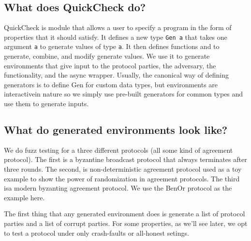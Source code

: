 


\subsection{What does QuickCheck do?}
QuickCheck is module that allows a user to specify a program in the form of properties that it should satisfy. 
It defines a new type \texttt{Gen a} that takes one argument \texttt{a} to generate values of type \texttt{a}. 
It then defines functions and to generate, combine, and modify generate values. 
We use it to generate environments that give input to the protocol parties, the adversary, the functionality, and the async wrapper.
Usually, the canonical way of defining generators is to define Gen for custom data types, but environments are interactivein nature so we simply use pre-built generators for common types and use them to generate inputs.

\subsection{What do generated environments look like?}
We do fuzz testing for a three different protocols (all some kind of agreement protocol). 
The first is a byzantine broadcast protocol that always terminates after three rounds. 
The second, is non-deterministic agreement protocol used as a toy example to show the power of randomization in agreement protocols. 
The third isa modern byzanting agreement protocol.
We use the BenOr protocol as the example here. 

The first thing that any generated environment does is generate a list of protocol parties and a list of corrupt parties. For some properties, as we'll see later, we opt to test a protocol under only crash-faults or all-honest setings. 

